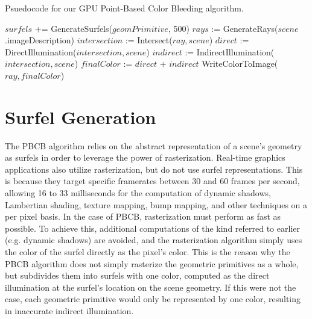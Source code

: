 \begin{algorithm}[H]
\captionfont
\caption[GPU PBCB Algorithm]{Psuedocode for our GPU Point-Based Color Bleeding algorithm.}
\label{alg:gpu_pbcb}
{\fontsize{10}{9}\selectfont
\begin{algorithmic}
         \State $surfels$ += GenerateSurfels($geomPrimitive$, 500)
      \EndFor
      \State $rays$ := GenerateRays($scene$.imageDescription)
         \State $intersection$ := Intersect($ray, scene$)
         \State $direct$ := DirectIllumination($intersection, scene$)
         \State $indirect$ := IndirectIllumination($intersection, scene$)
         \State $finalColor$ := $direct$ + $indirect$
         \State WriteColorToImage($ray, finalColor$)
      \EndFor
   \EndFunction
\end{algorithmic}
}
\end{algorithm}

\section{Surfel Generation}
\label{sec:surfel_generation}

The PBCB algorithm relies on the abstract representation of a scene's geometry as surfels in order to leverage the power of rasterization. Real-time graphics applications also utilize rasterization, but do not use surfel representations. This is because they target specific framerates between 30 and 60 frames per second, allowing 16 to 33 milliseconds for the computation of dynamic shadows, Lambertian shading, texture mapping, bump mapping, and other techniques on a per pixel basis. In the case of PBCB, rasterization must perform as fast as possible. To achieve this, additional computations of the kind referred to earlier (e.g. dynamic shadows) are avoided, and the rasterization algorithm simply uses the color of the surfel directly as the pixel's color. This is the reason why the PBCB algorithm does not simply rasterize the geometric primitives as a whole, but subdivides them into surfels with one color, computed as the direct illumination at the surfel's location on the scene geometry. If this were not the case, each geometric primitive would only be represented by one color, resulting in inaccurate indirect illumination.

